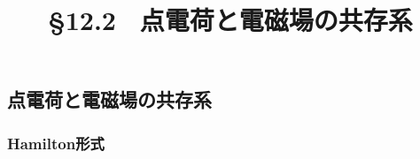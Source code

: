 \documentclass[a4paper, 10pt]{jsarticle}
\title{\S 12.2 \ 点電荷と電磁場の共存系}
\author{}
\theoremstyle{definition}
\begin{document}
\maketitle

\setcounter{section}{2}

\subsection{点電荷と電磁場の共存系}
\setcounter{subsubsection}{1}

\subsubsection{Hamilton形式}
\end{document}
